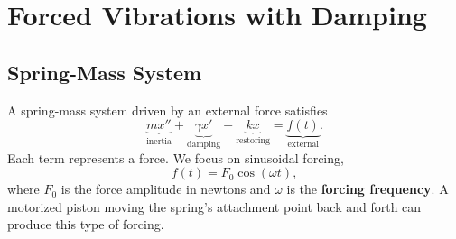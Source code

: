 \documentclass[10pt,letterpaper]{article}
\begin{document}


\section{Forced Vibrations with Damping}

\subsection{Spring-Mass System}

A spring-mass system driven by an external force satisfies
\[
\underbrace{mx''}_{\text{inertia}}
+\underbrace{\gamma x'}_{\text{damping}}
+\underbrace{kx}_{\text{restoring}}
=\underbrace{f(t)}_{\text{external}}.
\]
Each term represents a force. We focus on sinusoidal forcing,
\[
f(t)=F_0\cos(\omega t),
\]
where $F_0$ is the force amplitude in newtons and $\omega$
is the \textbf{forcing frequency}. A motorized piston
moving the spring's attachment point back and forth
can produce this type of forcing.
\end{document}
